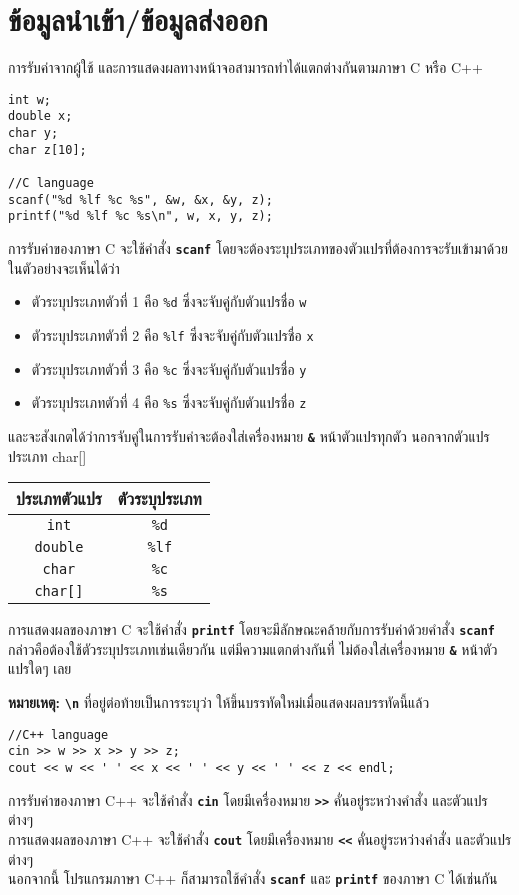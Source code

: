 \section{ข้อมูลนำเข้า/ข้อมูลส่งออก}

การรับค่าจากผู้ใช้ และการแสดงผลทางหน้าจอสามารถทำได้แตกต่างกันตามภาษา C หรือ C++
\begin{lstlisting}
int w;
double x;
char y;
char z[10];

//C language
scanf("%d %lf %c %s", &w, &x, &y, z);
printf("%d %lf %c %s\n", w, x, y, z);
\end{lstlisting}
การรับค่าของภาษา C จะใช้คำสั่ง \textbf{\texttt{scanf}} โดยจะต้องระบุประเภทของตัวแปรที่ต้องการจะรับเข้ามาด้วย ในตัวอย่างจะเห็นได้ว่า
\begin{itemize}
\item ตัวระบุประเภทตัวที่ 1 คือ \texttt{\%d} ซึ่งจะจับคู่กับตัวแปรชื่อ \texttt{w}
\item ตัวระบุประเภทตัวที่ 2 คือ \texttt{\%lf} ซึ่งจะจับคู่กับตัวแปรชื่อ \texttt{x}
\item ตัวระบุประเภทตัวที่ 3 คือ \texttt{\%c} ซึ่งจะจับคู่กับตัวแปรชื่อ \texttt{y}
\item ตัวระบุประเภทตัวที่ 4 คือ \texttt{\%s} ซึ่งจะจับคู่กับตัวแปรชื่อ \texttt{z}
\end{itemize}
และจะสังเกตได้ว่าการจับคู่ในการรับค่าจะต้องใส่เครื่องหมาย \textbf{\texttt{\&}} หน้าตัวแปรทุกตัว นอกจากตัวแปรประเภท char[]
\begin{center}
\begin{tabular}{||c|c||}
\hline
ประเภทตัวแปร & ตัวระบุประเภท \\
\hline
\texttt{int} & \texttt{\%d} \\
\texttt{double} & \texttt{\%lf} \\
\texttt{char} & \texttt{\%c} \\
\texttt{char[]} & \texttt{\%s} \\
\hline
\end{tabular}
\end{center}
การแสดงผลของภาษา C จะใช้คำสั่ง \textbf{\texttt{printf}} โดยจะมีลักษณะคล้ายกับการรับค่าด้วยคำสั่ง \textbf{\texttt{scanf}} กล่าวคือต้องใช้ตัวระบุประเภทเช่นเดียวกัน แต่มีความแตกต่างกันที่ ไม่ต้องใส่เครื่องหมาย \textbf{\texttt{\&}} หน้าตัวแปรใดๆ เลย

\noindent\textbf{หมายเหตุ:} \textbf{\texttt{\textbackslash n}} ที่อยู่ต่อท้ายเป็นการระบุว่า ให้ขึ้นบรรทัดใหม่เมื่อแสดงผลบรรทัดนี้แล้ว

\begin{lstlisting}
//C++ language
cin >> w >> x >> y >> z;
cout << w << ' ' << x << ' ' << y << ' ' << z << endl;
\end{lstlisting}
การรับค่าของภาษา C++ จะใช้คำสั่ง \textbf{\texttt{cin}} โดยมีเครื่องหมาย \textbf{\texttt{>>}} คั่นอยู่ระหว่างคำสั่ง และตัวแปรต่างๆ \\
การแสดงผลของภาษา C++ จะใช้คำสั่ง \textbf{\texttt{cout}} โดยมีเครื่องหมาย \textbf{\texttt{<<}} คั่นอยู่ระหว่างคำสั่ง และตัวแปรต่างๆ \\
นอกจากนี้ โปรแกรมภาษา C++ ก็สามารถใช้คำสั่ง \textbf{\texttt{scanf}} และ \textbf{\texttt{printf}} ของภาษา C ได้เช่นกัน

